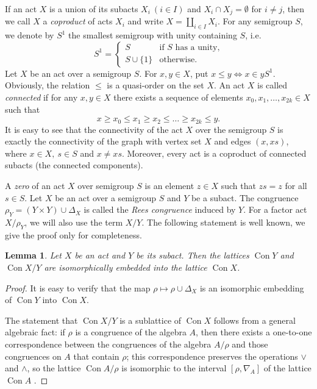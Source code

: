 \documentclass{birkau}
\numberwithin{equation}{section}
\theoremstyle{plain}
\newtheorem{lemma}[theorem]{Lemma}
\theoremstyle{definition}
\DeclareMathOperator{\Con}{Con}
\begin{document}
	If an act $X$ is a union of its subacts $ X_i\ (i \in I) $ and $ X_i \cap X_j = \emptyset $ for $i \neq j$, then we call $X$ a \textit{coproduct} of acts $X_i$ and write $ X = \coprod_{i\in I} X_i $. For any semigroup $S$, we denote by $S^1$ the smallest semigroup with unity containing $S$, i.e.
	$$ S^1 =
		\begin{cases}
			S & \text{if $S$ has a unity,}\\
			S \cup \{1\} & \text{otherwise.}
		\end{cases}
	$$
	Let $X$ be an act over a semigroup $S$. For $ x,y \in X$, put $ x \leqslant y \Leftrightarrow x \in yS^1 $. Obviously, the relation $\leqslant$ is a quasi-order on the set $X$. An act $X$ is called \textit{connected} if for any $x,y\in X$ there exists a sequence of elements $x_0,x_1,\ldots,x_{2k}\in X$ such that $$ x \geqslant x_0 \leqslant x_1 \geqslant x_2 \leqslant \ldots \geqslant x_{2k} \leqslant y. $$ It is easy to see that the connectivity of the act $X$ over the semigroup $S$ is exactly the connectivity of the graph with vertex set $X$ and edges $ (x,xs) $, where $ x \in X,\ s \in S $ and $x \neq xs$. Moreover, every act is a coproduct of connected subacts (the connected components).
	
	A \textit{zero} of an act $X$ over semigroup $S$ is an element $z \in X$ such that $zs=z$ for all $s \in S$.
	Let $X$ be an act over a semigroup $S$ and $Y$ be a subact. The congruence $\rho_Y = (Y \times Y) \cup \Delta_X$ is called the \textit{Rees congruence} induced by $Y$. For a factor act ${X}/{\rho_Y}$, we will also use the term $X/Y$. The following statement is well known, we give the proof only for completeness.
	
	\begin{lemma} \label{lemma:01}
	    Let $X$ be an act and $Y$ be its subact. Then the lattices $\Con Y$ and $\Con {X}/{Y}$ are isomorphically embedded into the lattice $\Con X$.
	\end{lemma}
	\begin{proof}
	    It is easy to verify that the map $\rho \mapsto \rho \cup \Delta_X$ is an isomorphic embedding of $\Con Y$ into $\Con X$.
		
	The statement that $\Con {X}/{Y}$ is a sublattice of $\Con X$ follows from a general algebraic fact: if $\rho$ is a congruence of the algebra $A$, then there exists a one-to-one correspondence between the congruences of the algebra ${A}/{\rho}$ and those congruences on $A$ that contain $\rho$; this correspondence preserves the operations $\vee$ and $\wedge$, so the lattice $\Con {A}/{\rho}$ is isomorphic to the interval $[\rho, \nabla_A]$ of the lattice $\Con A$ \cite[Theorem 6.20]{burris}.
    \end{proof}
	
\end{document}
